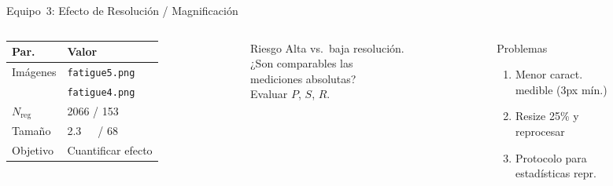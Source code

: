 \documentclass[aspectratio=169,12pt]{beamer}
\begin{document}
\begin{frame}{Equipo~3: Efecto de Resolución / Magnificación}
	\begin{columns}
		\begin{column}{0.38\textwidth}
			\centering\scriptsize
			\begin{tabular}{ll}
				\toprule
				\textbf{Par.}    & \textbf{Valor}                              \\
				\midrule
				Imágenes         & \texttt{fatigue5.png}                       \\
				                 & \texttt{fatigue4.png}                       \\
				$N_\mathrm{reg}$ & 2066 / 153                                  \\
				Tamaño           & \SI{2.3}{\mega\byte}\ / \SI{68}{\kilo\byte} \\
				Objetivo         & Cuantificar efecto                          \\
				\bottomrule
			\end{tabular}
		\end{column}
		\begin{column}{0.28\textwidth}
			\begin{alertblock}{\scriptsize Riesgo}
				\scriptsize
				Alta vs.\ baja resolución.\\
				¿Son comparables las\\
				mediciones absolutas?\\
				Evaluar $P$, $S$, $R$.
			\end{alertblock}
		\end{column}
		\begin{column}{0.3\textwidth}
			\begin{exampleblock}{\scriptsize Problemas}
				\scriptsize
				\begin{enumerate}
					\item[P3.1] Menor caract.\\
					      medible (3px mín.)
					\item[P3.2] Resize 25\% y\\
					      reprocesar
					\item[P3.3] Protocolo para\\
					      estadísticas repr.
				\end{enumerate}
			\end{exampleblock}
		\end{column}
	\end{columns}
\end{frame}
\end{document}
